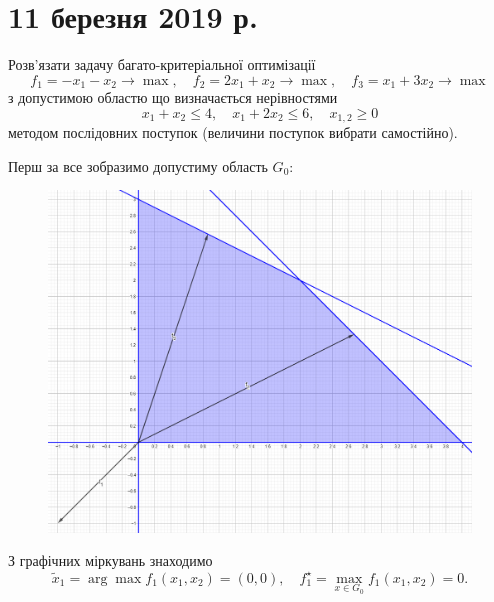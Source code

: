 \newpage
    
\section*{11 березня 2019 р.}

\setcounter{problem}{0}

\begin{problem}
    Розв'язати задачу багато-критеріальної оптимізації \[ f_1 = - x_1 - x_2 \to \max, \quad f_2 = 2 x_1 + x_2 \to \max, \quad f_3 = x_1 + 3 x_2 \to \max \] з допустимою областю що визначається нерівностями \[ x_1 + x_2 \le 4, \quad x_1 + 2 x_2 \le 6, \quad x_{1, 2} \ge 0 \] методом послідовних поступок (величини поступок вибрати самостійно).
\end{problem}

\begin{solution}
    Перш за все зобразимо допустиму область $G_0$:
    \begin{figure}[H]
        \centering
        \includegraphics[width=\textwidth]{successive_concessions_1_1.png}
    \end{figure}

    З графічних міркувань знаходимо \[ \tilde x_1 = \arg \max f_1(x_1, x_2) = (0, 0), \quad f_1^\star = \max_{x \in G_0} f_1(x_1, x_2) = 0. \]
    

\end{solution}
